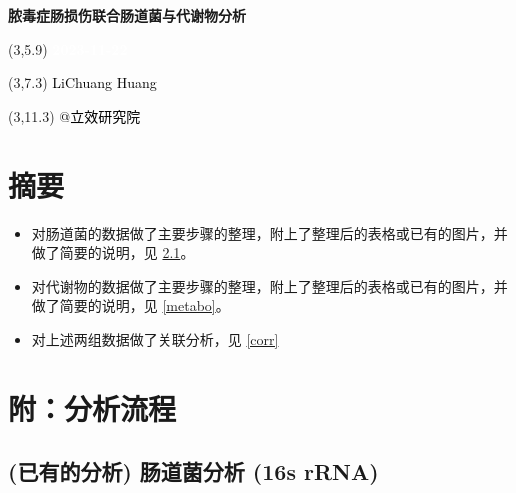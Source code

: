 \documentclass[
]{article}
\author{}
\date{\vspace{-2.5em}}
\providecommand{\tightlist}{%
  \setlength{\itemsep}{0pt}\setlength{\parskip}{0pt}}
\begin{document}
\begin{titlepage} 
\begin{center} \textbf{\Huge
脓毒症肠损伤联合肠道菌与代谢物分析} \vspace{4em}
\begin{textblock}{10}(3,5.9) \huge
\textbf{\textcolor{white}{2023-11-22}}
\end{textblock} \begin{textblock}{10}(3,7.3)
\Large \textcolor{black}{LiChuang Huang}
\end{textblock} \begin{textblock}{10}(3,11.3)
\Large \textcolor{black}{@立效研究院}
\end{textblock} \end{center} \end{titlepage}
\restoregeometry


\tableofcontents

\listoffigures

\listoftables

\newpage


\hypertarget{abstract}{%
\section{摘要}\label{abstract}}

\begin{itemize}
\tightlist
\item
  对肠道菌的数据做了主要步骤的整理，附上了整理后的表格或已有的图片，并做了简要的说明，见 \ref{micro}。
\item
  对代谢物的数据做了主要步骤的整理，附上了整理后的表格或已有的图片，并做了简要的说明，见 \ref{metabo}。
\item
  对上述两组数据做了关联分析，见 \ref{corr}
\end{itemize}

\hypertarget{workflow}{%
\section{附：分析流程}\label{workflow}}

\hypertarget{micro}{%
\subsection{(已有的分析) 肠道菌分析 (16s rRNA)}\label{micro}}
\end{document}
